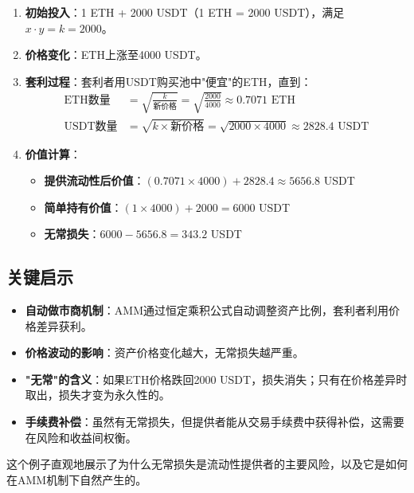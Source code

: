 \documentclass[12pt]{ctexart}
\begin{document}
\begin{enumerate}
    \item \textbf{初始投入}：1 ETH + 2000 USDT（1 ETH = 2000 USDT），满足 $x \cdot y = k = 2000$。
    
    \item \textbf{价格变化}：ETH上涨至4000 USDT。
    
    \item \textbf{套利过程}：套利者用USDT购买池中"便宜"的ETH，直到：
    \begin{align*}
        \text{ETH数量} &= \sqrt{\frac{k}{\text{新价格}}} = \sqrt{\frac{2000}{4000}} \approx 0.7071 \text{ ETH} \\
        \text{USDT数量} &= \sqrt{k \times \text{新价格}} = \sqrt{2000 \times 4000} \approx 2828.4 \text{ USDT}
    \end{align*}
    
    \item \textbf{价值计算}：
    \begin{itemize}
        \item \textbf{提供流动性后价值}：$(0.7071 \times 4000) + 2828.4 \approx 5656.8$ USDT
        \item \textbf{简单持有价值}：$(1 \times 4000) + 2000 = 6000$ USDT
        \item \textbf{无常损失}：$6000 - 5656.8 = 343.2$ USDT
    \end{itemize}
\end{enumerate}

\subsection{关键启示}

\begin{itemize}
    \item \textbf{自动做市商机制}：AMM通过恒定乘积公式自动调整资产比例，套利者利用价格差异获利。
    \item \textbf{价格波动的影响}：资产价格变化越大，无常损失越严重。
    \item \textbf{"无常"的含义}：如果ETH价格跌回2000 USDT，损失消失；只有在价格差异时取出，损失才变为永久性的。
    \item \textbf{手续费补偿}：虽然有无常损失，但提供者能从交易手续费中获得补偿，这需要在风险和收益间权衡。
\end{itemize}

这个例子直观地展示了为什么无常损失是流动性提供者的主要风险，以及它是如何在AMM机制下自然产生的。
\end{document}
